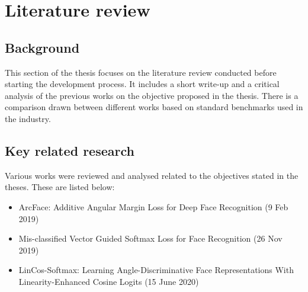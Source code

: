 \chapter{Literature review}
\label{mathchapter}

\section{Background}
This section of the thesis focuses on the literature review conducted before starting the development process. It includes a short write-up and a critical analysis of the previous works on the objective proposed in the thesis. There is a comparison drawn between different works based on standard benchmarks used in the industry.
\section{Key related research}
Various works were reviewed and analysed related to the objectives stated in the theses. These are listed below:\\
\begin{itemize}
	\item ArcFace: Additive Angular Margin Loss for Deep Face Recognition 
(9 Feb 2019)
	\item Mis-classified Vector Guided Softmax Loss for Face Recognition
(26 Nov 2019)
	\item LinCos-Softmax: Learning Angle-Discriminative Face Representations With Linearity-Enhanced Cosine Logits
 (15 June 2020)
\end{itemize}
